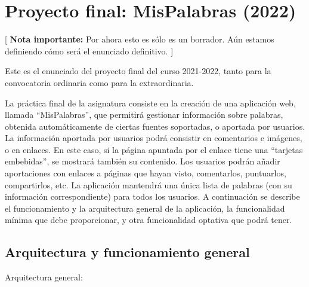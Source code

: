 \section{Proyecto final: MisPalabras (2022)}
\label{practica-final-2022-05}

[ \textbf{Nota importante:} Por ahora esto es sólo es un borrador. Aún estamos definiendo cómo será el enunciado definitivo. ]

Este es el enunciado del proyecto final del curso 2021-2022, tanto para la convocatoria ordinaria como para la extraordinaria.

La práctica final de la asignatura consiste en la creación de una aplicación web, llamada ``MisPalabras'', que permitirá gestionar información sobre palabras, obtenida automáticamente de ciertas fuentes soportadas, o aportada por usuarios. La información aportada por usuarios podrá consistir en comentarios e imágenes, o en enlaces. En este caso, si la página apuntada por el enlace tiene una ``tarjetas embebidas'', se mostrará también su contenido. Los usuarios podrán añadir aportaciones con enlaces a páginas que hayan visto, comentarlos, puntuarlos, compartirlos, etc. La aplicación mantendrá una única lista de palabras (con su información correspondiente) para todos los usuarios. A continuación se describe el funcionamiento y la arquitectura general de la aplicación, la funcionalidad mínima que debe proporcionar, y otra funcionalidad optativa que podrá tener.

\subsection{Arquitectura y funcionamiento general}

Arquitectura general:

